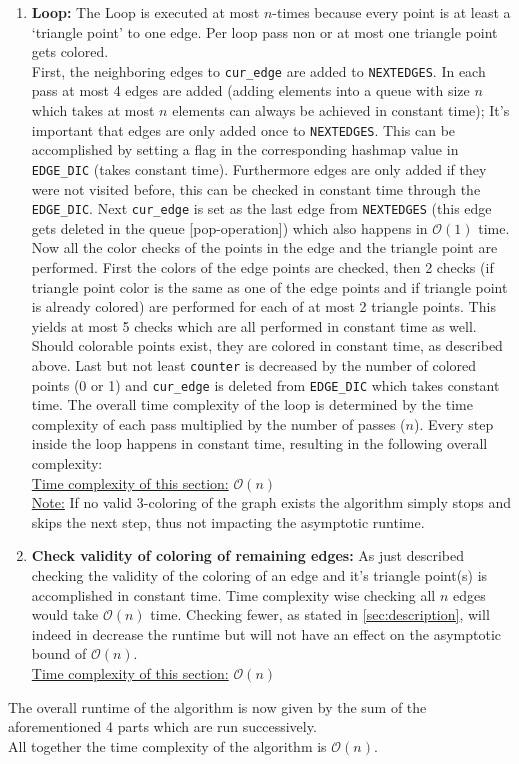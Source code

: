 \documentclass[english]{scrartcl}
\newcommand{\code}{\texttt}
\begin{document}
\begin{enumerate}
    \item \textbf{Loop:} The Loop is executed at most $n$-times because every point is at least a \enquote*{triangle point} to one edge. Per loop pass non or at most one triangle point gets colored. \\ First, the neighboring edges to \code{cur\_edge} are added to \code{NEXTEDGES}. In each pass at most 4 edges are added (adding elements into a queue with size $n$ which takes at most $n$ elements can always be achieved in constant time); It's important that edges are only added once to \code{NEXTEDGES}. This can be accomplished by setting a flag in the corresponding hashmap value in \code{EDGE\_DIC} (takes constant time). Furthermore edges are only added if they were not visited before, this can be checked in constant time through the \code{EDGE\_DIC}. Next \code{cur\_edge} is set as the last edge from \code{NEXTEDGES} (this edge gets deleted in the queue [pop-operation]) which also happens in $\mathcal{O}(1)$ time.\\ Now all the color checks of the points in the edge and the triangle point are performed. First the colors of the edge points are checked, then 2 checks (if triangle point color is the same as one of the edge points and if triangle point is already colored) are performed for each of at most 2 triangle points. This yields at most 5 checks which are all performed in constant time as well. Should colorable points exist, they are colored in constant time, as described above. Last but not least \code{counter} is decreased by the number of colored points (0 or 1) and \code{cur\_edge} is deleted from \code{EDGE\_DIC} which takes constant time.    
    The overall time complexity of the loop is determined by the time complexity of each pass multiplied by the number of passes ($n$). Every step inside the loop happens in constant time, resulting in the following overall complexity:\\ \underline{Time complexity of this section:} $\mathcal{O}(n)$
    \\ \underline{Note:} If no valid 3-coloring of the graph exists the algorithm simply stops and skips the next step, thus not impacting the asymptotic runtime.
    \item \textbf{Check validity of coloring of remaining edges:} As just described checking the validity of the coloring of an edge and it's triangle point(s) is accomplished in constant time. Time complexity wise checking all $n$ edges would take $\mathcal{O}(n)$ time. Checking fewer, as stated in \autoref{sec:description}, will indeed in decrease the runtime but will not have an effect on the asymptotic bound of $\mathcal{O}(n)$. \\ \underline{Time complexity of this section:} $\mathcal{O}(n)$
\end{enumerate}
The overall runtime of the algorithm is now given by the sum of the aforementioned 4 parts which are run successively. \\
All together the time complexity of the algorithm is $\mathcal{O}(n)$. 
\end{document}
